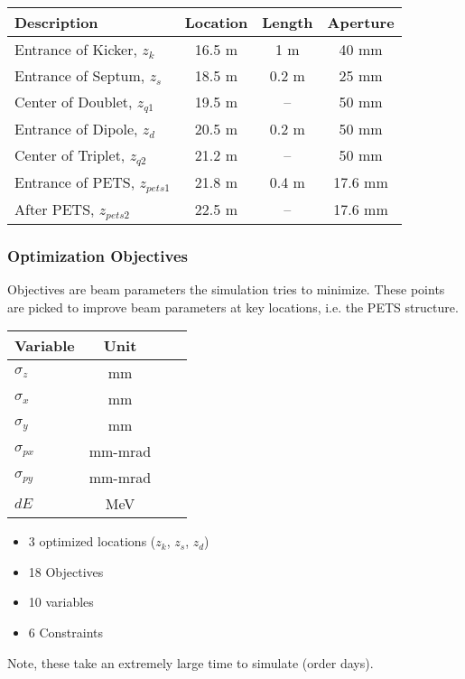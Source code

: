 \documentclass[professionalfonts,t]{beamer}
\begin{document}
\begin{frame}
\vspace{1em}
\begin{minipage}{0.55\textwidth}
\begin{table}[hbt] 
\centering
\begin{tabular}{ l *{3}{c}}
	\toprule
	\textbf{Description} & \textbf{Location} & \textbf{Length} & \textbf{Aperture}\\
	\midrule
	Entrance of Kicker, 	$ z_k$ 		& 16.5 m & 1 m   & 40 mm\\
	Entrance of Septum, 	$ z_s$  	& 18.5 m & 0.2 m & 25 mm\\
	Center of Doublet, 		$ z_{q1}$	& 19.5 m & -- 	 & 50 mm\\
	Entrance of Dipole, 	$ z_d$  	& 20.5 m & 0.2 m & 50 mm\\
	Center of Triplet,		$ z_{q2}$	& 21.2 m & --    & 50 mm\\
	Entrance of PETS, $z_{pets1}$  & 21.8 m & 0.4 m 	 & 17.6 mm\\
	After PETS, 			$z_{pets2}$ & 22.5 m &  --   & 17.6 mm\\
	\bottomrule	
\end{tabular}	
\end{table}
\end{minipage}
\end{frame}
\begin{frame}
\frametitle{Optimization Objectives}
Objectives are beam parameters the simulation tries to minimize.
These points are picked to improve beam parameters at key locations, 
i.e. the PETS structure.

\vspace{1em}
\begin{minipage}{0.45\textwidth}
\begin{table}[hbt] 
\centering
\begin{tabular}{ l *{3}{c}}
\toprule
\textbf{Variable} &  \textbf{Unit} \\
\midrule
$\sigma_z$ 		& mm \\
$\sigma_{x}$ 	& mm \\
$\sigma_y$ 		& mm \\
$\sigma_{px}$ 	& mm-mrad \\
$\sigma_{py}$ 	& mm-mrad \\
$dE$			& MeV\\
\bottomrule	
\end{tabular}	
\end{table}
\end{minipage}
\begin{minipage}{0.45\textwidth}
\begin{itemize}
\item 3 optimized locations ($z_k$, $z_s$, $z_d$)
\item 18 Objectives
\item 10 variables 
\item 6 Constraints
\end{itemize}
\end{minipage}
\centering
Note, these take an extremely large time to simulate (order days).
\end{frame}
\end{document}
